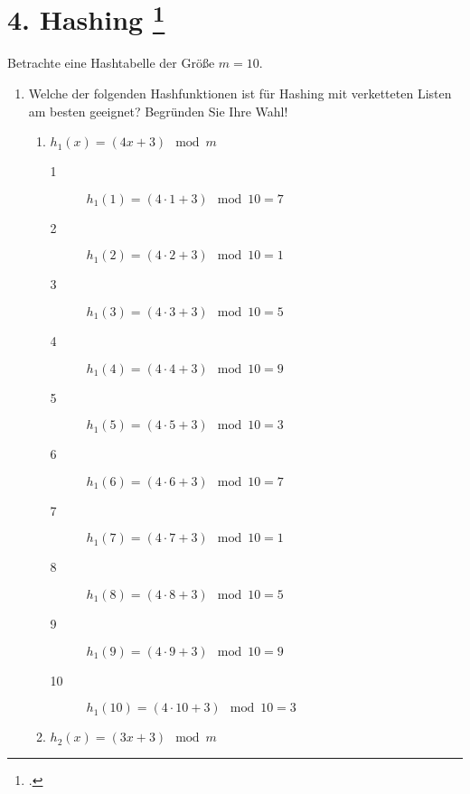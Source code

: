 \documentclass{bschlangaul-aufgabe}
\begin{document}

\section{4. Hashing
\footcite[Thema 2 Aufgabe 4 Seite 7]{examen:66115:2016:03}}

Betrachte eine Hashtabelle der Größe $m = 10$.

\begin{enumerate}


\item Welche der folgenden Hashfunktionen ist für Hashing mit
verketteten Listen am besten geeignet?
Begründen Sie Ihre Wahl!

\begin{enumerate}
\item $h_1(x) = (4x + 3) \mod m$

\begin{bAntwort}
\begin{description}
\item[1] $h_1(1) = (4 \cdot 1 + 3) \mod 10 = 7$
\item[2] $h_1(2) = (4 \cdot 2 + 3) \mod 10 = 1$
\item[3] $h_1(3) = (4 \cdot 3 + 3) \mod 10 = 5$
\item[4] $h_1(4) = (4 \cdot 4 + 3) \mod 10 = 9$
\item[5] $h_1(5) = (4 \cdot 5 + 3) \mod 10 = 3$
\item[6] $h_1(6) = (4 \cdot 6 + 3) \mod 10 = 7$
\item[7] $h_1(7) = (4 \cdot 7 + 3) \mod 10 = 1$
\item[8] $h_1(8) = (4 \cdot 8 + 3) \mod 10 = 5$
\item[9] $h_1(9) = (4 \cdot 9 + 3) \mod 10 = 9$
\item[10] $h_1(10) = (4 \cdot 10 + 3) \mod 10 = 3$
\end{description}
\end{bAntwort}

\item $h_2(x) = (3x + 3) \mod m$


\end{enumerate}
\end{enumerate}
\end{document}
